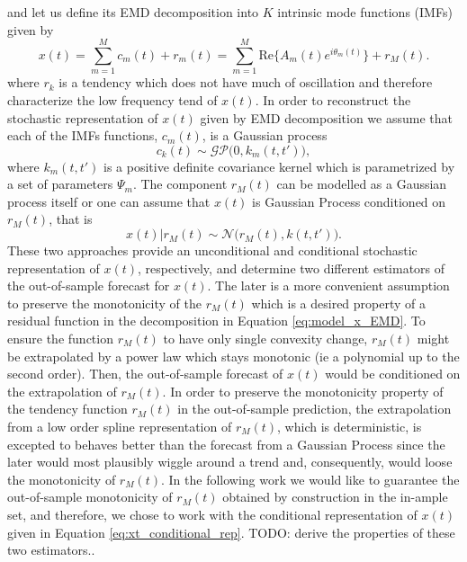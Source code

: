 and let us define its EMD decomposition into $K$ intrinsic mode functions (IMFs) given by 
\begin{equation}\label{eq:model_x_EMD}
x(t) = \sum_{m = 1}^M c_m(t) + r_m(t) = \sum_{m = 1}^M \text{Re}\Big\{ A_m(t)  e^{i \theta_m(t)} \Big\} + r_M(t).
\end{equation}
where $r_k$ is a tendency which does not have much of oscillation and therefore characterize the low frequency tend of $x(t)$. In order to reconstruct the stochastic representation of $x(t)$ given by EMD decomposition we assume that each of the IMFs functions, $c_m(t)$, is a Gaussian process 
\begin{equation}\label{eq:model_IMF_GP_k}
c_k(t) \sim \mathcal{GP} \Big(0, k_m(t,t')\Big), 
\end{equation}
where $k_m(t,t')$ is a positive definite covariance kernel which is parametrized by a set of parameters $\Psi_m$.   The component $r_M(t)$ can be modelled as a Gaussian process itself or one can assume that $x(t)$ is Gaussian Process conditioned on $r_M(t)$, that is
\begin{equation}\label{eq:xt_conditional_rep}
x(t) | r_M(t) \sim \mathcal{N} \Big(r_M(t),  k(t,t')  \Big).
\end{equation}
These two approaches provide an unconditional and conditional stochastic representation of $x(t)$, respectively, and determine two different estimators of the out-of-sample forecast for $x(t)$.  The later is a more convenient assumption to preserve the monotonicity of the $r_M(t)$ which is a desired property of a residual function in the decomposition in Equation \eqref{eq:model_x_EMD}.  To ensure the function $r_M(t)$ to have only single convexity change, $r_M(t)$ might be extrapolated by a power law which stays monotonic (ie a polynomial up to the second order). Then, the out-of-sample forecast of $x(t)$ would be conditioned on the extrapolation of $r_M(t)$.  In order to preserve the monotonicity property of the tendency function $r_M(t)$ in the out-of-sample prediction, the extrapolation from a low order spline representation of $r_M(t)$, which is deterministic,  is excepted to behaves better than the forecast from a Gaussian Process since the later would most plausibly wiggle around a trend and, consequently, would loose the monotonicity of $r_M(t)$.  In the following work we would like to guarantee the out-of-sample monotonicity of $r_M(t)$ obtained by construction in the in-ample set,  and therefore, we chose to work with the conditional representation of $x(t)$ given in Equation \eqref{eq:xt_conditional_rep}.  {\color{red} TODO: derive the properties of these two estimators.}.

